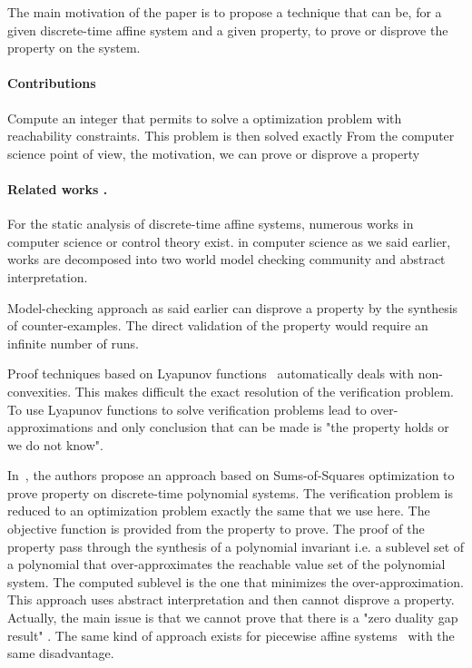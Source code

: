 \documentclass[10pt]{article}
\begin{document}
The main motivation of the paper is to propose a technique that can be, for a given discrete-time affine system and a given property, to prove or disprove the property on the system. 

\paragraph{Contributions}
Compute an integer that permits to solve a optimization problem with reachability constraints.
This problem is then solved exactly
From the computer science point of view, the motivation, we can prove or disprove a property

\paragraph{Related works .}
For the static analysis of discrete-time affine systems, numerous works in computer science or control theory exist. 
in computer science as we said earlier, works are decomposed into two world model checking community and abstract interpretation. 

Model-checking approach as said earlier can disprove a property by the synthesis of counter-examples. The direct validation of the property would require an infinite number of runs.  

Proof techniques based on Lyapunov functions~\cite{roozbehani2013optimization,blanchini2009lyapunov} automatically deals with non-convexities. This makes difficult the exact resolution of the verification problem. To use Lyapunov functions to solve verification problems lead  to over-approximations and only conclusion that can be made is "the property holds or we do not know".

In~\cite{adje2015property}, the authors propose  an approach based on Sums-of-Squares optimization to prove property on discrete-time polynomial systems. The verification problem is reduced to an optimization problem exactly the same that we use here.  The objective function is provided from the property to prove. The proof of the property pass through the synthesis of a polynomial invariant i.e.  a sublevel set of a polynomial that over-approximates the reachable value set of the polynomial system. The computed sublevel is the one that minimizes the over-approximation. This approach uses abstract interpretation and then cannot disprove a property. Actually, the main issue is that we cannot prove that there is a "zero duality gap result" . The same kind of approach exists for piecewise affine systems~\cite{10.1007/978-3-319-54292-8_2} with the same disadvantage. 
\end{document}
